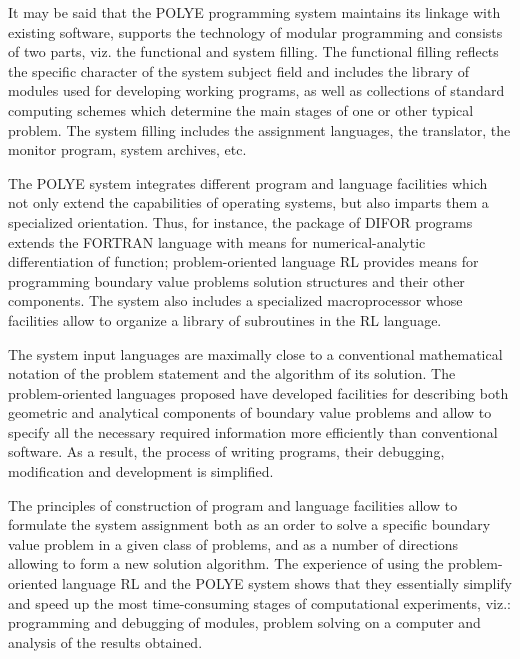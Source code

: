It may be said that the POLYE programming system maintains its linkage with
existing software, supports the technology of modular programming and
consists of two parts, viz. the functional and system filling. The
functional filling reflects the specific character of the system subject
field and includes the library of modules used for developing working
programs, as well as collections of standard computing schemes which
determine the main stages of one or other typical problem. The system
filling includes the assignment languages, the translator, the monitor
program, system archives, etc.

The POLYE system integrates different program and language facilities which
not only extend the capabilities of operating systems, but also imparts them
a specialized orientation. Thus, for instance, the package of DIFOR programs
extends the FORTRAN language with means for numerical-analytic
differentiation of function; problem-oriented language RL provides means for
programming boundary value problems solution structures and their other
components. The system also includes a specialized macroprocessor whose
facilities allow to organize a library of subroutines in the RL language.

The system input languages are maximally close to a conventional
mathematical notation of the problem statement and the algorithm of its
solution. The problem-oriented languages proposed have developed facilities
for describing both geometric and analytical components of boundary value
problems and allow to specify all the necessary required information more
efficiently than conventional software. As a result, the process of writing
programs, their debugging, modification and development is simplified.

The principles of construction of program and language facilities allow to
formulate the system assignment both as an order to solve a specific
boundary value problem in a given class of problems, and as a number of
directions allowing to form a new solution algorithm. The experience of
using the problem-oriented language RL and the POLYE system shows that they
essentially simplify and speed up the most time-consuming stages of
computational experiments, viz.: programming and debugging of modules,
problem solving on a computer and analysis of the results obtained.

